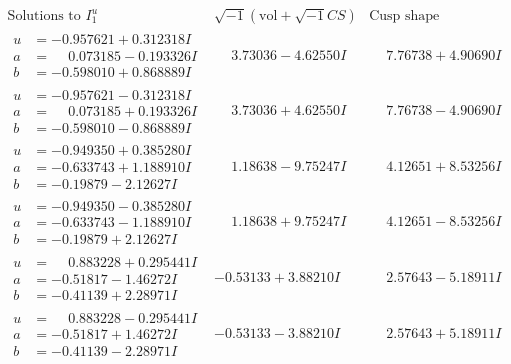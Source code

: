 \documentclass[1p]{elsarticle_modified}
\theoremstyle{definition}
\newcommand{\I}{\sqrt{-1}}
\begin{document}
$$\begin{array}{c|c|c}  
\text{Solutions to }I^u_{1}& \I (\text{vol} + \sqrt{-1}CS) & \text{Cusp shape}\\
 \hline 
\begin{aligned}
u &= -0.957621 + 0.312318 I \\
a &= \phantom{-}0.073185 - 0.193326 I \\
b &= -0.598010 + 0.868889 I\end{aligned}
 & \phantom{-}3.73036 - 4.62550 I & \phantom{-}7.76738 + 4.90690 I \\ \hline\begin{aligned}
u &= -0.957621 - 0.312318 I \\
a &= \phantom{-}0.073185 + 0.193326 I \\
b &= -0.598010 - 0.868889 I\end{aligned}
 & \phantom{-}3.73036 + 4.62550 I & \phantom{-}7.76738 - 4.90690 I \\ \hline\begin{aligned}
u &= -0.949350 + 0.385280 I \\
a &= -0.633743 + 1.188910 I \\
b &= -0.19879 - 2.12627 I\end{aligned}
 & \phantom{-}1.18638 - 9.75247 I & \phantom{-}4.12651 + 8.53256 I \\ \hline\begin{aligned}
u &= -0.949350 - 0.385280 I \\
a &= -0.633743 - 1.188910 I \\
b &= -0.19879 + 2.12627 I\end{aligned}
 & \phantom{-}1.18638 + 9.75247 I & \phantom{-}4.12651 - 8.53256 I \\ \hline\begin{aligned}
u &= \phantom{-}0.883228 + 0.295441 I \\
a &= -0.51817 - 1.46272 I \\
b &= -0.41139 + 2.28971 I\end{aligned}
 & -0.53133 + 3.88210 I & \phantom{-}2.57643 - 5.18911 I \\ \hline\begin{aligned}
u &= \phantom{-}0.883228 - 0.295441 I \\
a &= -0.51817 + 1.46272 I \\
b &= -0.41139 - 2.28971 I\end{aligned}
 & -0.53133 - 3.88210 I & \phantom{-}2.57643 + 5.18911 I \\ \hline\begin{aligned}

\end{aligned}
\end{array}$$
\end{document}
